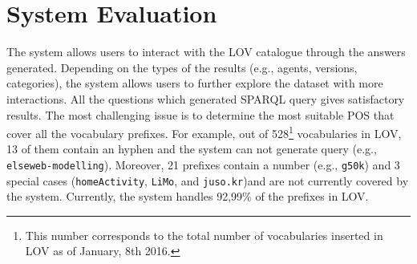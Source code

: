 \documentclass[runningheads,a4paper]{llncs}
\newcommand{\todo}[1]{\noindent\textcolor{red}{{\bf \{TODO}: #1{\bf \}}}}
\begin{document}
\section{System Evaluation}
\label{sec:evaluation}

The system allows users to interact with the LOV catalogue through the answers generated. Depending on the types of the results (e.g., agents, versions, categories), the system allows users to further explore the dataset with more interactions.
All the questions which generated SPARQL query gives satisfactory results. The most challenging issue is to determine the most suitable POS that cover all the vocabulary prefixes. For example, out of 528\footnote{This number corresponds to the total number of vocabularies inserted in LOV as of January, 8th 2016.} vocabularies in LOV, 13 of them contain an hyphen and the system can not generate query (e.g., \texttt{elseweb-modelling}). Moreover, 21 prefixes contain a number (e.g., \texttt{g50k}) and 3 special cases (\texttt{homeActivity}, \texttt{LiMo}, and \texttt{juso.kr})and are not currently covered by the system. Currently, the system handles 92,99\% of the prefixes in LOV.







\end{document}
